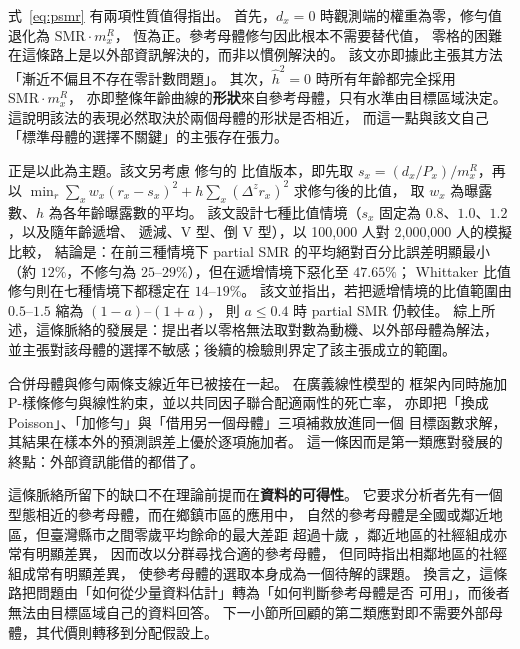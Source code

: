 式~\eqref{eq:psmr} 有兩項性質值得指出。
首先，$d_x=0$ 時觀測端的權重為零，修勻值退化為 $\mathrm{SMR}\cdot m^R_x$，
恆為正。參考母體修勻因此根本不需要替代值，
零格的困難在這條路上是以外部資訊解決的，而非以慣例解決的。
該文亦即據此主張其方法「漸近不偏且不存在零計數問題」。
其次，$\hat h^2=0$ 時所有年齡都完全採用 $\mathrm{SMR}\cdot m^R_x$，
亦即整條年齡曲線的\textbf{形狀}來自參考母體，只有水準由目標區域決定。
這說明該法的表現必然取決於兩個母體的形狀是否相近，
而這一點與該文自己「標準母體的選擇不關鍵」的主張存在張力。

\citet{yue2019} 正是以此為主題。該文另考慮 \citet{whittaker1923} 修勻的
比值版本，即先取 $s_x=(d_x/P_x)/m^R_x$，再以
$\min_r \sum_x w_x(r_x-s_x)^2+h\sum_x(\Delta^z r_x)^2$ 求修勻後的比值，
取 $w_x$ 為曝露數、$h$ 為各年齡曝露數的平均。
該文設計七種比值情境（$s_x$ 固定為 $0.8$、$1.0$、$1.2$，以及隨年齡遞增、
遞減、V 型、倒 V 型），以 100,000 人對 2,000,000 人的模擬比較，
結論是：在前三種情境下 partial SMR 的平均絕對百分比誤差明顯最小
（約 $12\%$，不修勻為 $25$--$29\%$），但在遞增情境下惡化至 $47.65\%$；
Whittaker 比值修勻則在七種情境下都穩定在 $14$--$19\%$。
該文並指出，若把遞增情境的比值範圍由 $0.5$--$1.5$ 縮為 $(1-a)$--$(1+a)$，
則 $a\le 0.4$ 時 partial SMR 仍較佳。
綜上所述，這條脈絡的發展是：提出者以零格無法取對數為動機、以外部母體為解法，
並主張對該母體的選擇不敏感；後續的檢驗則界定了該主張成立的範圍。

合併母體與修勻兩條支線近年已被接在一起。\citet{pitt2018} 在廣義線性模型的
框架內同時施加 P-樣條修勻與線性約束，並以共同因子聯合配適兩性的死亡率，
亦即把「換成 Poisson」、「加修勻」與「借用另一個母體」三項補救放進同一個
目標函數求解，其結果在樣本外的預測誤差上優於逐項施加者。
這一條因而是第一類應對發展的終點：外部資訊能借的都借了。

這條脈絡所留下的缺口不在理論前提而在\textbf{資料的可得性}。
它要求分析者先有一個型態相近的參考母體，而在鄉鎮市區的應用中，
自然的參考母體是全國或鄰近地區，但臺灣縣市之間零歲平均餘命的最大差距
超過十歲 \citep{yue2019}，鄰近地區的社經組成亦常有明顯差異，
\citet{wangyue2026} 因而改以分群尋找合適的參考母體，
但同時指出相鄰地區的社經組成常有明顯差異，
使參考母體的選取本身成為一個待解的課題。
換言之，這條路把問題由「如何從少量資料估計」轉為「如何判斷參考母體是否
可用」，而後者無法由目標區域自己的資料回答。
下一小節所回顧的第二類應對即不需要外部母體，其代價則轉移到分配假設上。
